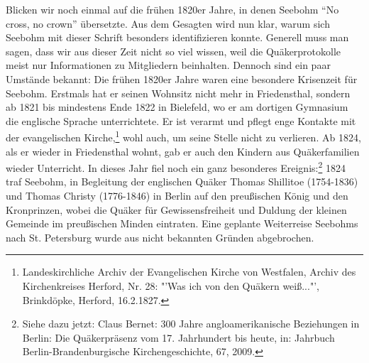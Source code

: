 Blicken wir noch einmal auf die frühen 1820er Jahre, in denen Seebohm "`No
cross, no crown"' übersetzte. Aus dem Gesagten wird nun klar, warum sich Seebohm
mit dieser Schrift besonders identifizieren konnte. Generell muss man sagen,
dass wir aus dieser Zeit nicht so viel wissen, weil die Quäkerprotokolle meist
nur Informationen zu Mitgliedern beinhalten. Dennoch sind ein paar Umstände
bekannt: Die frühen 1820er Jahre waren eine besondere Krisenzeit für Seebohm.
Erstmals hat er seinen Wohnsitz nicht mehr in Friedensthal, sondern ab 1821 bis
mindestens Ende 1822 in Bielefeld, wo er am dortigen Gymnasium die englische
Sprache unterrichtete. Er ist verarmt und pflegt enge Kontakte mit der
evangelischen Kirche,\footnote{Landeskirchliche Archiv der Evangelischen Kirche
von Westfalen, Archiv des
Kirchenkreises Herford, Nr. 28: "'Was ich von den Quäkern weiß..."', Brinkdöpke,
Herford, 16.2.1827.} wohl auch, um seine Stelle nicht zu verlieren. Ab
1824, als er wieder in Friedensthal wohnt, gab er auch den Kindern aus
Quäkerfamilien wieder Unterricht. In dieses Jahr fiel noch ein ganz besonderes
Ereignis:\footnote{Siehe dazu jetzt: Claus Bernet: 300 Jahre angloamerikanische
Beziehungen in
Berlin: Die Quäkerpräsenz vom 17. Jahrhundert bis heute, in: Jahrbuch
Berlin-Brandenburgische Kirchengeschichte, 67, 2009.} 1824 traf Seebohm, in
Begleitung der englischen Quäker Thomas Shillitoe (1754-1836) und Thomas Christy
(1776-1846) in Berlin auf den preußischen König und den Kronprinzen, wobei die
Quäker für Gewissensfreiheit und Duldung der kleinen Gemeinde im preußischen
Minden eintraten. Eine geplante Weiterreise Seebohms nach St. Petersburg wurde
aus nicht bekannten Gründen abgebrochen.

\medskip

